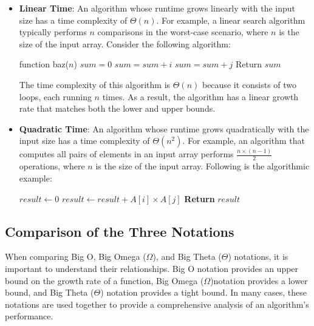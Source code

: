 \documentclass[12pt]{book} %
\begin{document}
\begin{itemize}
    \item \textbf{Linear Time}: An algorithm whose runtime grows linearly with the input size has a time complexity of \(\Theta(n)\). For example, a linear search algorithm typically performs \(n\) comparisons in the worst-case scenario, where \(n\) is the size of the input array.
    \FloatBarrier
    Consider the following algorithm:
\FloatBarrier
\begin{algorithm}[H]
\caption{Example Algorithm For Big Theta (\(\Theta\)) Notation}
\begin{algorithmic}
\State function baz($n$)
\State $sum = 0$
\State $sum = sum + i$
\EndFor
{}
\State $sum = sum + j$
\EndFor
\State Return $sum$
\end{algorithmic}
\end{algorithm}
\FloatBarrier
The time complexity of this algorithm is $\Theta(n)$ because it consists of two loops, each running $n$ times. As a result, the algorithm has a linear growth rate that matches both the lower and upper bounds.
\FloatBarrier
    \item \textbf{Quadratic Time}: An algorithm whose runtime grows quadratically with the input size has a time complexity of \(\Theta(n^2)\). For example, an algorithm that computes all pairs of elements in an input array performs \(\frac{n \times (n-1)}{2}\) operations, where \(n\) is the size of the input array.
    \FloatBarrier
    Following is the algorithmic example:
    \FloatBarrier
    \begin{algorithm}
\caption{Quadratic Time Algorithm}
\begin{algorithmic}[1]
    \State $result \gets 0$
            \State $result \gets result + A[i] \times A[j]$
        \EndFor
    \EndFor
    \State \textbf{Return} $result$
\EndFunction
\end{algorithmic}
\end{algorithm}
\end{itemize}

\subsection{Comparison of the Three Notations}

When comparing Big O, Big Omega (\(\Omega\)), and Big Theta (\(\Theta\)) notations, it is important to understand their relationships. Big O notation provides an upper bound on the growth rate of a function, Big Omega (\(\Omega\))notation provides a lower bound, and Big Theta (\(\Theta\)) notation provides a tight bound. In many cases, these notations are used together to provide a comprehensive analysis of an algorithm's performance.
\end{document}
